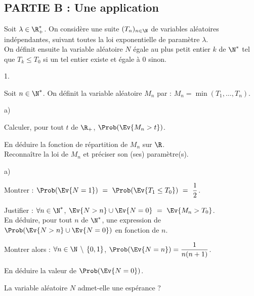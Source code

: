 \documentclass[11pt]{article}%
\begin{document}
\subsection*{PARTIE B : Une application} %

\noindent %
Soit $\lambda \in \R_+^*$. On considère une suite $(T_n)_{n \in \N}$
de variables aléatoires indépendantes, suivant toutes la loi
exponentielle de paramètre $\lambda$.\\
On définit ensuite la variable aléatoire $N$ égale au plus petit
entier $k$ de $\N^*$ tel que $T_k \leq T_0$ si un tel entier existe et
égale à $0$ sinon.
\begin{noliste}{1.}
  \setlength{\itemsep}{4mm}
  \setcounter{enumi}{3}
\item Soit $n \in \N^*$. On définit la variable aléatoire $M_n$ par :
  $M_n  = \min(T_1, \ldots, T_n)$.
  \begin{noliste}{a)}
    \setlength{\itemsep}{2mm}
  \item Calculer, pour tout $t$ de $\R_+$, $\Prob(\Ev{M_n > t})$.
    
  \item En déduire la fonction de répartition de $M_n$ sur $\R$.\\
    Reconnaître la loi de $M_n$ et préciser son (ses) paramètre(s).
  \end{noliste}
  
\item
  \begin{noliste}{a)}
    \setlength{\itemsep}{2mm}
  \item Montrer : $\Prob(\Ev{N = 1}) \ = \ \Prob(\Ev{T_1 \leq T_0}) \
    = \ \dfrac{1}{2}$.
    
  \item Justifier : $\forall n \in \N^*$, $\Ev{N > n} \cup \Ev{N = 0}
    \ = \ \Ev{M_n >  T_0}$.\\
    En déduire, pour tout $n$ de $\N^* $, une expression de
    $\Prob(\Ev{N > n} \cup \Ev{N = 0})$ en fonction de $n$.
    
  \item Montrer alors : $\forall n \in \N \, \setminus \, \{0,1\}$,
    $\Prob(\Ev{ N = n}) = \dfrac{1}{n(n+1)}$.
    
  \item En déduire la valeur de $\Prob(\Ev{N = 0})$.
  \end{noliste}
  
\item La variable aléatoire $N$ admet-elle une espérance ?
\end{noliste}
\end{document}
